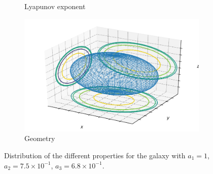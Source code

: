 \begin{figure}[h]
\begin{subfigure}[t]{0.4\textwidth}
        \caption{Lyapunov exponent}
    \end{subfigure}
    \begin{subfigure}[t]{0.4\textwidth}
        \includegraphics[width=\textwidth]{"../Files/Week 13/images/13_ellipsoid"}
        \caption{Geometry}
    \end{subfigure}
    \caption{Distribution of the different properties for the galaxy with $a_1 = 1$, $a_2 = 7.5\times10^{-1}$, $a_3 = 6.8\times10^{-1}$.}
    \label{fig: g13}
\end{figure}


